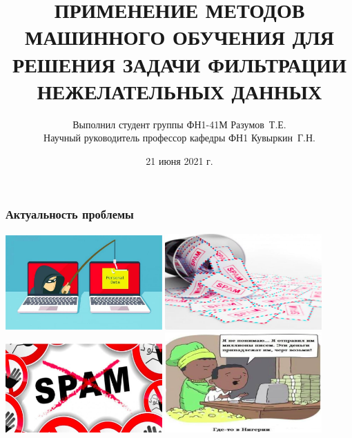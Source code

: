 \documentclass[compress,professionalfont]{beamer}
\title[]{ПРИМЕНЕНИЕ МЕТОДОВ МАШИННОГО ОБУЧЕНИЯ ДЛЯ РЕШЕНИЯ ЗАДАЧИ ФИЛЬТРАЦИИ НЕЖЕЛАТЕЛЬНЫХ ДАННЫХ}
\author[Разумов Т.Е.]{
Выполнил студент группы ФН1-41М Разумов~Т.Е. \\
Научный руководитель профессор кафедры ФН1 Кувыркин~Г.Н.}
\institute[]{МГТУ им. Н.Э.~Баумана}
\date{21 июня 2021 г.}
\begin{document}

\begin{frame}[plain]
	\maketitle
\end{frame}

\begin{frame}
\frametitle{Актуальность проблемы}

\begin{center}
\includegraphics[width=0.45\textwidth]{actual1.jpg}
\includegraphics[width=0.45\textwidth]{actual2.jpg}
\includegraphics[width=0.45\textwidth]{actual3.jpg}
\includegraphics[width=0.45\textwidth]{actual4.jpg}
\end{center}
\end{frame}
\end{document}
